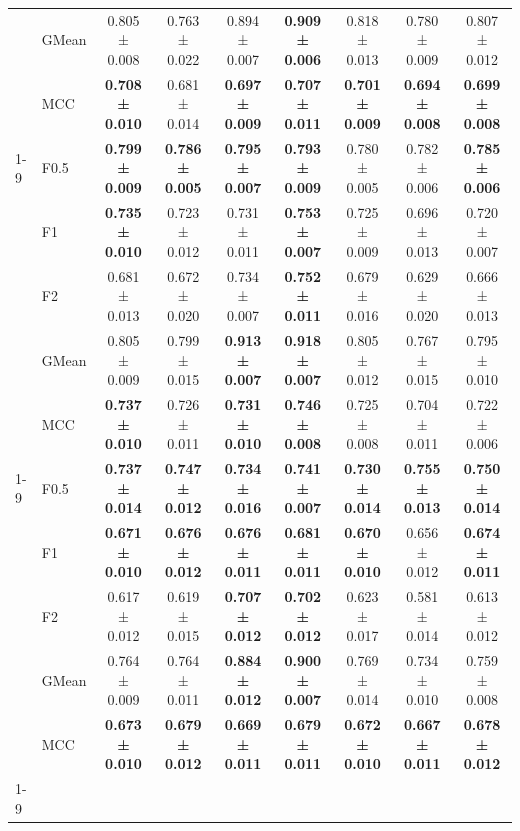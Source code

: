 \begin{table}[H]
{\begin{tabular}{llccccccc}
 & GMean & 0.805 ± 0.008 & 0.763 ± 0.022 & 0.894 ± 0.007 & \textbf{0.909 ± 0.006} & 0.818 ± 0.013 & 0.780 ± 0.009 & 0.807 ± 0.012 \\
 & MCC & \textbf{0.708 ± 0.010} & 0.681 ± 0.014 & \textbf{0.697 ± 0.009} & \textbf{0.707 ± 0.011} & \textbf{0.701 ± 0.009} & \textbf{0.694 ± 0.008} & \textbf{0.699 ± 0.008} \\
\cline{1-9}
\multirow[t]{5}{*}{TabPFN} & F0.5 & \textbf{0.799 ± 0.009} & \textbf{0.786 ± 0.005} & \textbf{0.795 ± 0.007} & \textbf{0.793 ± 0.009} & 0.780 ± 0.005 & 0.782 ± 0.006 & \textbf{0.785 ± 0.006} \\
 & F1 & \textbf{0.735 ± 0.010} & 0.723 ± 0.012 & 0.731 ± 0.011 & \textbf{0.753 ± 0.007} & 0.725 ± 0.009 & 0.696 ± 0.013 & 0.720 ± 0.007 \\
 & F2 & 0.681 ± 0.013 & 0.672 ± 0.020 & 0.734 ± 0.007 & \textbf{0.752 ± 0.011} & 0.679 ± 0.016 & 0.629 ± 0.020 & 0.666 ± 0.013 \\
 & GMean & 0.805 ± 0.009 & 0.799 ± 0.015 & \textbf{0.913 ± 0.007} & \textbf{0.918 ± 0.007} & 0.805 ± 0.012 & 0.767 ± 0.015 & 0.795 ± 0.010 \\
 & MCC & \textbf{0.737 ± 0.010} & 0.726 ± 0.011 & \textbf{0.731 ± 0.010} & \textbf{0.746 ± 0.008} & 0.725 ± 0.008 & 0.704 ± 0.011 & 0.722 ± 0.006 \\
\cline{1-9}
\multirow[t]{5}{*}{XGBoost} & F0.5 & \textbf{0.737 ± 0.014} & \textbf{0.747 ± 0.012} & \textbf{0.734 ± 0.016} & \textbf{0.741 ± 0.007} & \textbf{0.730 ± 0.014} & \textbf{0.755 ± 0.013} & \textbf{0.750 ± 0.014} \\
 & F1 & \textbf{0.671 ± 0.010} & \textbf{0.676 ± 0.012} & \textbf{0.676 ± 0.011} & \textbf{0.681 ± 0.011} & \textbf{0.670 ± 0.010} & 0.656 ± 0.012 & \textbf{0.674 ± 0.011} \\
 & F2 & 0.617 ± 0.012 & 0.619 ± 0.015 & \textbf{0.707 ± 0.012} & \textbf{0.702 ± 0.012} & 0.623 ± 0.017 & 0.581 ± 0.014 & 0.613 ± 0.012 \\
 & GMean & 0.764 ± 0.009 & 0.764 ± 0.011 & \textbf{0.884 ± 0.012} & \textbf{0.900 ± 0.007} & 0.769 ± 0.014 & 0.734 ± 0.010 & 0.759 ± 0.008 \\
 & MCC & \textbf{0.673 ± 0.010} & \textbf{0.679 ± 0.012} & \textbf{0.669 ± 0.011} & \textbf{0.679 ± 0.011} & \textbf{0.672 ± 0.010} & \textbf{0.667 ± 0.011} & \textbf{0.678 ± 0.012} \\
\cline{1-9}
\bottomrule
\end{tabular}
    }
\end{table}
